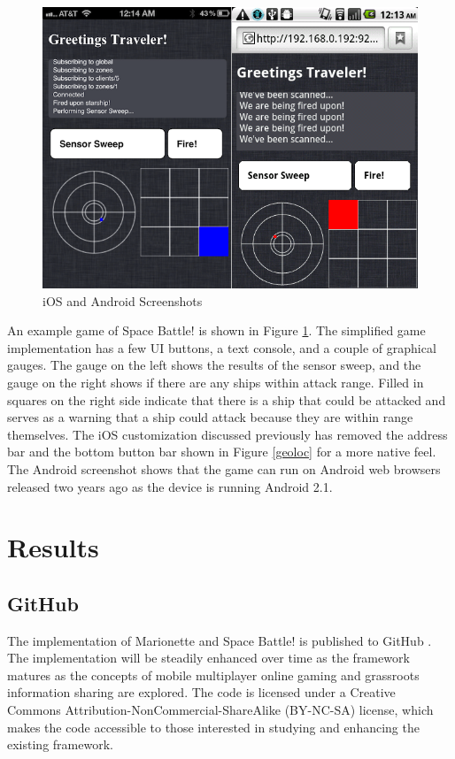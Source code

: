 \documentclass[12pt]{report}	%
\theoremstyle{definition}
\theoremstyle{remark}
\begin{document}
\begin{figure}[h!]
\centering
\includegraphics[scale=0.6]{4.png}
\caption{iOS and Android Screenshots}
\label{screenshot}
\end{figure}

An example game of Space Battle! is shown in Figure
\ref{screenshot}. The simplified game implementation
has a few UI buttons, a text console, and a couple of graphical gauges.
The gauge on the left shows the results of the sensor sweep, and the
gauge on the right shows if there are any ships within attack range.
Filled in squares on the right side indicate that there is a ship that
could be attacked and serves as a warning that a ship could attack
because they are within range themselves. The iOS customization
discussed previously has removed the address bar and the bottom button
bar shown in Figure \ref{geoloc} for a more native
feel. The Android screenshot shows that the game can run on Android web
browsers released two years ago as the device is running Android 2.1.

\chapter{Results}

\section{GitHub}

The implementation of Marionette and Space Battle! is published to
GitHub \cite{marionette}. The implementation will be
steadily enhanced over time as the framework matures as the concepts of
mobile multiplayer online gaming and grassroots information sharing are
explored. The code is licensed under a Creative Commons
Attribution-NonCommercial-ShareAlike (BY-NC-SA) license, which makes the
code accessible to those interested in studying and enhancing the
existing framework.
\end{document}
